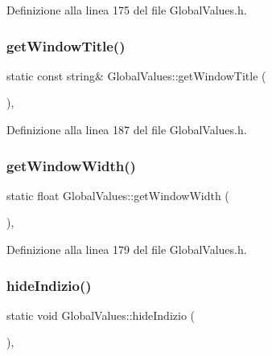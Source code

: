 Definizione alla linea 175 del file Global\+Values.\+h.

\mbox{\label{class_global_values_aa7e0d10bacf8d0309a8c43098419baae}} 
\subsubsection{\texorpdfstring{get\+Window\+Title()}{getWindowTitle()}}
{\footnotesize\ttfamily static const string\& Global\+Values\+::get\+Window\+Title (\begin{DoxyParamCaption}{ }\end{DoxyParamCaption})\hspace{0.3cm}{\ttfamily [inline]}, {\ttfamily [static]}}



Definizione alla linea 187 del file Global\+Values.\+h.

\mbox{\label{class_global_values_a252eb890189d2f19cb44200523fad440}} 
\subsubsection{\texorpdfstring{get\+Window\+Width()}{getWindowWidth()}}
{\footnotesize\ttfamily static float Global\+Values\+::get\+Window\+Width (\begin{DoxyParamCaption}{ }\end{DoxyParamCaption})\hspace{0.3cm}{\ttfamily [inline]}, {\ttfamily [static]}}



Definizione alla linea 179 del file Global\+Values.\+h.

\mbox{\label{class_global_values_ad7a083c6a7fddf9c7b81b9bfcc045dbf}} 
\subsubsection{\texorpdfstring{hide\+Indizio()}{hideIndizio()}}
{\footnotesize\ttfamily static void Global\+Values\+::hide\+Indizio (\begin{DoxyParamCaption}{ }\end{DoxyParamCaption})\hspace{0.3cm}{\ttfamily [inline]}, {\ttfamily [static]}}



